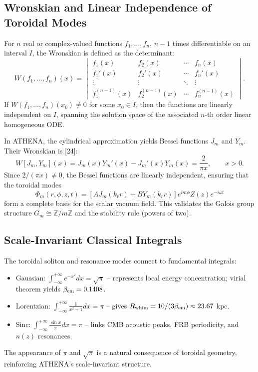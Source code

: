 \documentclass[12pt, a4paper]{article}
\begin{document}
\subsection{Wronskian and Linear Independence of Toroidal Modes}
For $n$ real or complex-valued functions $f_1, \ldots, f_n$, $n-1$ times differentiable on an interval $I$, the Wronskian is defined as the determinant:
\begin{equation}
W(f_1,\ldots,f_n)(x) = 
\begin{vmatrix}
f_1(x) & f_2(x) & \cdots & f_n(x) \\
f_1'(x) & f_2'(x) & \cdots & f_n'(x) \\
\vdots & \vdots & \ddots & \vdots \\
f_1^{(n-1)}(x) & f_2^{(n-1)}(x) & \cdots & f_n^{(n-1)}(x)
\end{vmatrix}.
\end{equation}
If $W(f_1,\ldots,f_n)(x_0) \neq 0$ for some $x_0 \in I$, then the functions are linearly independent on $I$, spanning the solution space of the associated $n$-th order linear homogeneous ODE.

In ATHENA, the cylindrical approximation yields Bessel functions $J_m$ and $Y_m$. Their Wronskian is [24]:
\begin{equation}
W[J_m, Y_m](x) = J_m(x)Y_m'(x) - J_m'(x)Y_m(x) = \frac{2}{\pi x}, \qquad x>0.
\end{equation}
Since $2/(\pi x) \neq 0$, the Bessel functions are linearly independent, ensuring that the toroidal modes
\begin{equation}
\Phi_m(r,\phi,z,t) = [A J_m(k_r r) + B Y_m(k_r r)] e^{im\phi} Z(z) e^{-i\omega t}
\end{equation}
form a complete basis for the scalar vacuum field. This validates the Galois group structure $G_m \cong \mathbb{Z}/m\mathbb{Z}$ and the stability rule (powers of two).

\subsection{Scale-Invariant Classical Integrals}
The toroidal soliton and resonance modes connect to fundamental integrals:
\begin{itemize}
    \item Gaussian: $\displaystyle \int_{-\infty}^{+\infty} e^{-x^2} dx = \sqrt{\pi}$ – represents local energy concentration; virial theorem yields $\beta_{\rm em}=0.1408$.
    \item Lorentzian: $\displaystyle \int_{-\infty}^{+\infty} \frac{1}{x^2+1} dx = \pi$ – gives $R_{\rm whim}=10/(3\beta_{\rm em})\approx 23.67$ kpc.
    \item Sinc: $\displaystyle \int_{-\infty}^{+\infty} \frac{\sin x}{x} dx = \pi$ – links CMB acoustic peaks, FRB periodicity, and $n(z)$ resonances.
\end{itemize}
The appearance of $\pi$ and $\sqrt{\pi}$ is a natural consequence of toroidal geometry, reinforcing ATHENA's scale-invariant structure.
\end{document}
